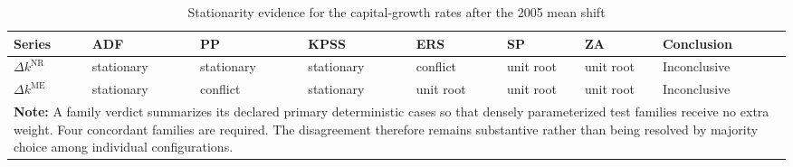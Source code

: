 \begin{table}[h!]
\centering\scriptsize
\caption{Stationarity evidence for the capital-growth rates after the 2005 mean shift}
\label{tab:growth-stationarity}
\begin{tabular}{p{1.35cm}p{1.35cm}p{1.35cm}p{1.35cm}p{1.35cm}p{1.35cm}p{1.35cm}p{1.75cm}}
\toprule
\textbf{Series} & \textbf{ADF} & \textbf{PP} & \textbf{KPSS} & \textbf{ERS} & \textbf{SP} & \textbf{ZA} & \textbf{Conclusion}\\
\midrule
$\Delta k^{\mathrm{NR}}$ & stationary & stationary & stationary & conflict & unit root & unit root & Inconclusive \\
$\Delta k^{\mathrm{ME}}$ & stationary & conflict & stationary & unit root & unit root & unit root & Inconclusive \\
\bottomrule
\multicolumn{8}{p{13.1cm}}{\footnotesize \textbf{Note:} A family verdict summarizes its declared primary deterministic cases so that densely parameterized test families receive no extra weight. Four concordant families are required. The disagreement therefore remains substantive rather than being resolved by majority choice among individual configurations.}
\end{tabular}
\end{table}
